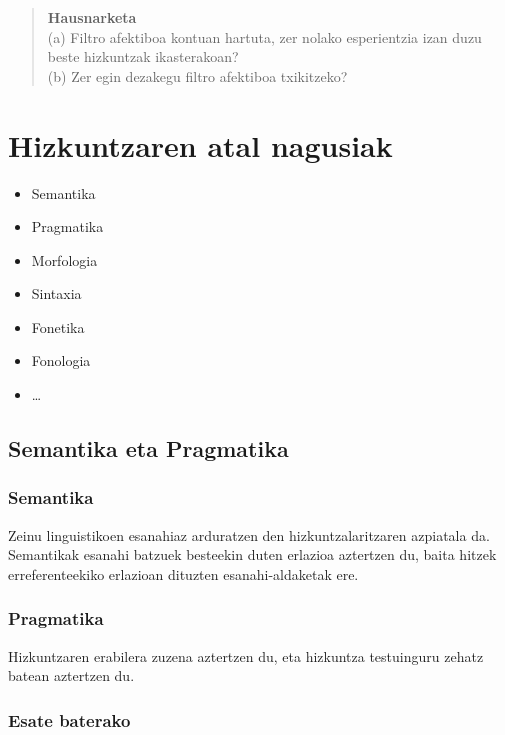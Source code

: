 \documentclass[
]{book}
\providecommand{\tightlist}{%
  \setlength{\itemsep}{0pt}\setlength{\parskip}{0pt}}
\begin{document}
\begin{quote}
\textbf{Hausnarketa}\\
(a) Filtro afektiboa kontuan hartuta, zer nolako esperientzia izan duzu beste hizkuntzak ikasterakoan?\\
(b) Zer egin dezakegu filtro afektiboa txikitzeko?
\end{quote}

\hypertarget{hizkuntzaren-atal-nagusiak}{%
\section{Hizkuntzaren atal nagusiak}\label{hizkuntzaren-atal-nagusiak}}

\begin{itemize}
\tightlist
\item
  Semantika
\item
  Pragmatika
\item
  Morfologia
\item
  Sintaxia
\item
  Fonetika
\item
  Fonologia
\item
  \ldots{}
\end{itemize}

\hypertarget{semantika-eta-pragmatika}{%
\subsection{Semantika eta Pragmatika}\label{semantika-eta-pragmatika}}

\hypertarget{semantika}{%
\subsubsection{Semantika}\label{semantika}}

Zeinu linguistikoen esanahiaz arduratzen den hizkuntzalaritzaren azpiatala da. Semantikak esanahi batzuek besteekin duten erlazioa aztertzen du, baita hitzek erreferenteekiko erlazioan dituzten esanahi-aldaketak ere.

\hypertarget{pragmatika}{%
\subsubsection{Pragmatika}\label{pragmatika}}

Hizkuntzaren erabilera zuzena aztertzen du, eta hizkuntza testuinguru zehatz batean aztertzen du.

\hypertarget{esate-baterako}{%
\subsubsection{Esate baterako}\label{esate-baterako}}
\end{document}
